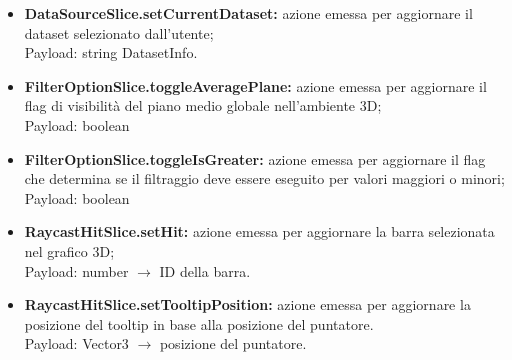 \begin{itemize}
        \item \textbf{DataSourceSlice.setCurrentDataset:} azione emessa per aggiornare il dataset selezionato dall'utente; \\ Payload: string DatasetInfo.
        \item \textbf{FilterOptionSlice.toggleAveragePlane:} azione emessa per aggiornare il flag di visibilità del piano medio globale nell'ambiente 3D; \\ Payload: boolean 
        \item \textbf{FilterOptionSlice.toggleIsGreater:} azione emessa per aggiornare il flag che determina se il filtraggio deve essere eseguito per valori maggiori o minori; \\ Payload: boolean
        \item \textbf{RaycastHitSlice.setHit:} azione emessa per aggiornare la barra selezionata nel grafico 3D; \\ Payload: number $\rightarrow$ ID della barra.
        \item \textbf{RaycastHitSlice.setTooltipPosition:} azione emessa per aggiornare la posizione del tooltip in base alla posizione del puntatore.\\ Payload: Vector3 $\rightarrow$ posizione del puntatore.
    \end{itemize}
